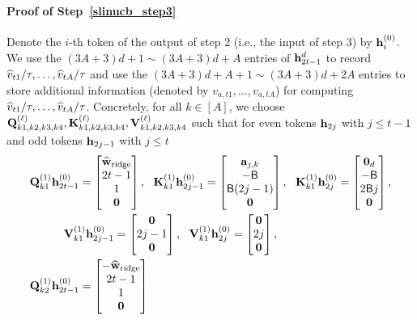 \paragraph{Proof of Step~\ref{slinucb_step3}}
Denote the $i$-th token  of the output of step 2 (i.e., the input of step 3) by ${\mathbf h}_i^{(0)}$.
We use the $(3A+3)d+1\sim (3A+3)d+A $ entries of ${\mathbf h}_{2t-1}^{{d}}$ to record $\widehat v_{t1}/{\tau},\ldots,\widehat v_{tA}/{\tau}$ and  use the $(3A+3)d+A+1\sim (3A+3)d+2A $ entries to store additional information (denoted by $ v_{a,t1},\ldots, v_{a,tA}$) for computing $ \widehat v_{t1}/{\tau},\ldots, \widehat  v_{tA}/{\tau}$. Concretely, for all $k\in[A]$, we choose
${\mathbf Q}_{k1,k2,k3,k4}^{(\ell)},{\mathbf K}_{k1,k2,k3,k4}^{(\ell)},{\mathbf V}_{k1,k2,k3,k4}^{(\ell)}$ such that   for even tokens ${\mathbf h}_{2j}$ with $j\leq t-1$ and odd tokens ${\mathbf h}_{2j-1}$ with $j\leq t$
\begin{align*}
    &{\mathbf Q}^{(1)}_{k1}{\mathbf h}^{(0)}_{2t-1}=\begin{bmatrix}
        \widehat{{\mathbf w}}_{{\rm ridge}} \\2t-1\\ 1\\{\mathbf 0}
    \end{bmatrix},~~ {\mathbf K}^{(1)}_{k1}{\mathbf h}^{(0)}_{2j-1}=\begin{bmatrix}
        {\mathbf a}_{j,k}\\  -{\mathsf{B}} \\ {\mathsf{B}} (2j-1)\\{\mathbf 0}
    \end{bmatrix},~~
    {\mathbf K}^{(1)}_{k1}{\mathbf h}^{(0)}_{2j}=\begin{bmatrix}
        {\mathbf 0}_d\\  -{\mathsf{B}} \\ 2{\mathsf{B}} j\\{\mathbf 0}
    \end{bmatrix},\\
    &~~~\qquad{\mathbf V}^{(1)}_{k1}{\mathbf h}^{(0)}_{2j-1}=\begin{bmatrix}
        {\mathbf 0}\\ 2j-1 \\ {\mathbf 0}
\end{bmatrix},~~{\mathbf V}^{(1)}_{k1}{\mathbf h}^{(0)}_{2j}=\begin{bmatrix}
        {\mathbf 0}\\ 2j \\ {\mathbf 0}
    \end{bmatrix},\\
    &
    {\mathbf Q}^{(1)}_{k2}{\mathbf h}^{(0)}_{2t-1}=\begin{bmatrix}
        -\widehat{{\mathbf w}}_{{\rm ridge}} \\2t-1\\1\\{\mathbf 0}

\end{bmatrix}
\end{align*}
